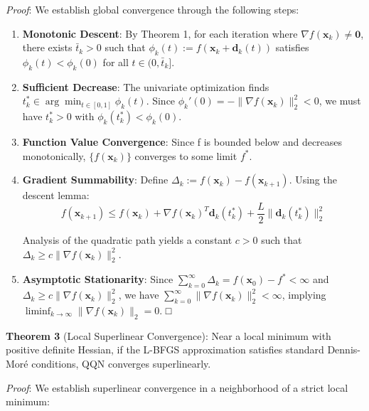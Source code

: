 \emph{Proof}: We establish global convergence through the following steps:

\begin{enumerate}
\def\labelenumi{\arabic{enumi}.}
\item
  \textbf{Monotonic Descent}: By Theorem 1, for each iteration where \(\nabla f(\mathbf{x}_k) \neq \mathbf{0}\), there
  exists \(\bar{t}_k > 0\) such that \(\phi_k(t) := f(\mathbf{x}_k + \mathbf{d}_k(t))\) satisfies
  \(\phi_k(t) < \phi_k(0)\) for all \(t \in (0, \bar{t}_k]\).
\item
  \textbf{Sufficient Decrease}: The univariate optimization finds \(t_k^* \in \arg\min_{t \in [0,1]} \phi_k(t)\). Since
  \(\phi_k'(0) = -\|\nabla f(\mathbf{x}_k)\|_2^2 < 0\), we must have \(t_k^* > 0\) with \(\phi_k(t_k^*) < \phi_k(0)\).
\item
  \textbf{Function Value Convergence}: Since f is bounded below and decreases monotonically, \(\{f(\mathbf{x}_k)\}\)
  converges to some limit \(f^*\).
\item
  \textbf{Gradient Summability}: Define \(\Delta_k := f(\mathbf{x}_k) - f(\mathbf{x}_{k+1})\). Using the descent lemma:
  \[f(\mathbf{x}_{k+1}) \leq f(\mathbf{x}_k) + \nabla f(\mathbf{x}_k)^T \mathbf{d}_k(t_k^*) + \frac{L}{2}\|\mathbf{d}_k(t_k^*)\|_2^2\]

  Analysis of the quadratic path yields a constant \(c > 0\) such that \(\Delta_k \geq c\|\nabla f(\mathbf{x}_k)\|_2^2\).
\item
  \textbf{Asymptotic Stationarity}: Since \(\sum_{k=0}^{\infty} \Delta_k = f(\mathbf{x}_0) - f^* < \infty\) and
  \(\Delta_k \geq c\|\nabla f(\mathbf{x}_k)\|_2^2\), we have \(\sum_{k=0}^{\infty} \|\nabla f(\mathbf{x}_k)\|_2^2 < \infty\),
  implying \(\liminf_{k \to \infty} \|\nabla f(\mathbf{x}_k)\|_2 = 0\). □
\end{enumerate}

\textbf{Theorem 3} (Local Superlinear Convergence): Near a local minimum with positive definite Hessian, if the L-BFGS
approximation satisfies standard Dennis-Moré conditions, QQN converges superlinearly.

\emph{Proof}: We establish superlinear convergence in a neighborhood of a strict local minimum:

